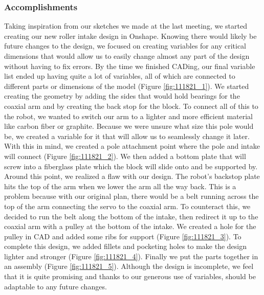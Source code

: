 \subsubsection*{Accomplishments}
Taking inspiration from our sketches we made at the last meeting, we started creating our new roller intake design in Onshape. Knowing there would likely be future changes to the design, we focused on creating variables for any critical dimensions that would allow us to easily change almost any part of the design without having to fix errors. By the time we finished CADing, our final variable list ended up having quite a lot of variables, all of which are connected to different parts or dimensions of the model (Figure \ref{fig:111821_1}). We started creating the geometry by adding the sides that would hold bearings for the coaxial arm and by creating the back stop for the block. To connect all of this to the robot, we wanted to switch our arm to a lighter and more efficient material like carbon fiber or graphite. Because we were unsure what size this pole would be, we created a variable for it that will allow us to seamlessly change it later. With this in mind, we created a pole attachment point where the pole and intake will connect (Figure \ref{fig:111821_2}).  We then added a bottom plate that will screw into a fiberglass plate which the block will slide onto and be supported by. Around this point, we realized a flaw with our design. The robot's backstop plate hits the top of the arm when we lower the arm all the way back. This is a problem because with our original plan, there would be a belt running across the top of the arm connecting the servo to the coaxial arm. To counteract this, we decided to run the belt along the bottom of the intake, then redirect it up to the coaxial arm with a pulley at the bottom of the intake. We created a hole for the pulley in CAD and added some ribs for support (Figure \ref{fig:111821_3}). To complete this design, we added fillets and pocketing holes to make the design lighter and stronger (Figure \ref{fig:111821_4}). Finally we put the parts together in an assembly (Figure \ref{fig:111821_5}). Although the design is incomplete, we feel that it is quite promising and thanks to our generous use of variables, should be adaptable to any future changes.

 

